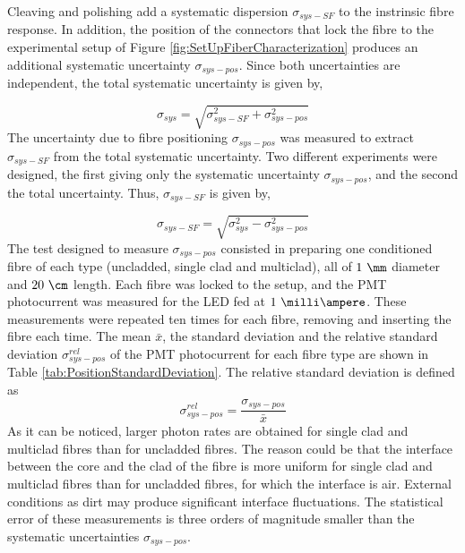Cleaving and polishing add a systematic dispersion $\sigma_{sys-SF}$ to the instrinsic fibre response. In addition, the position of the connectors that lock the fibre to the experimental setup of Figure \ref{fig:SetUpFiberCharacterization} produces an additional systematic uncertainty $\sigma_{sys-pos}$. Since both uncertainties are independent, the total systematic uncertainty is given by,

\begin{equation}
\sigma_{sys} = \sqrt{\sigma^2_{sys-SF} + \sigma^2_{sys-pos} }
\label{eq:TotalUncertaintyFiberCharacterization}
\end{equation}
The uncertainty due to fibre positioning $\sigma_{sys-pos}$ was measured to extract $\sigma_{sys-SF}$ from the total systematic uncertainty. Two different experiments were designed, the first giving only the systematic uncertainty $\sigma_{sys-pos}$, and the second the total uncertainty. Thus, $\sigma_{sys-SF}$ is given by,

\begin{equation}
\sigma_{sys-SF} = \sqrt{\sigma^2_{sys} - \sigma^2_{sys-pos} }
\label{eq:TMUncertaintyFiberCharacterization}
\end{equation}
The test designed to measure $\sigma_{sys-pos}$ consisted in preparing one conditioned fibre of each type (uncladded, single clad and multiclad), all of $1~\mm$ diameter and $20~\cm$ length. Each fibre was locked to the setup, and the PMT photocurrent was measured for the LED fed at $1~\milli\ampere$. These measurements were repeated ten times for each fibre, removing and inserting the fibre each time. The mean $\bar{x}$, the standard deviation  and the relative standard deviation $\sigma^{rel}_{sys-pos}$
of the PMT photocurrent for each fibre type are shown in Table \ref{tab:PositionStandardDeviation}. The relative standard deviation is defined as
\begin{equation}
\sigma^{rel}_{sys-pos} = \frac{\sigma_{sys-pos}}{\bar{x}}
\label{eq:RelativeStandardDesviation}
\end{equation}
As it can be noticed, larger photon rates are obtained for single clad and multiclad fibres than for uncladded fibres. The reason could be that the interface between the core and the clad of the fibre is more uniform for single clad and multiclad fibres than for uncladded fibres, for which the interface is air. External conditions as dirt may produce significant interface fluctuations. The statistical error of these measurements is three orders of magnitude smaller than the systematic uncertainties $\sigma_{sys-pos}$.

